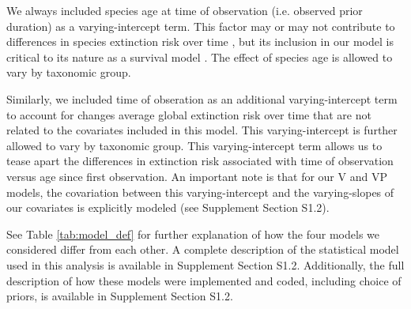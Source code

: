\documentclass[12pt,letterpaper]{article}
\begin{document}
\begin{refsection}
We always included species age at time of observation (i.e. observed prior duration) as a varying-intercept term. This factor may or may not contribute to differences in species extinction risk over time \citep{Smits2015,Finnegan2008,Ezard2012,VanValen1973,Liow2011,Crampton2016}, but its inclusion in our model is critical to its nature as a survival model \cite{Tutz2016}. The effect of species age is allowed to vary by taxonomic group. 

Similarly, we included time of obseration as an additional varying-intercept term to account for changes average global extinction risk over time that are not related to the covariates included in this model. This varying-intercept is further allowed to vary by taxonomic group. This varying-intercept term allows us to tease apart the differences in extinction risk associated with time of observation versus age since first observation. An important note is that for our V and VP models, the covariation between this varying-intercept and the varying-slopes of our covariates is explicitly modeled (see Supplement Section S1.2).

See Table \ref{tab:model_def} for further explanation of how the four models we considered differ from each other. A complete description of the statistical model used in this analysis is available in Supplement Section S1.2. Additionally, the full description of how these models were implemented and coded, including choice of priors, is available in Supplement Section S1.2.



\end{refsection}
\end{document}
